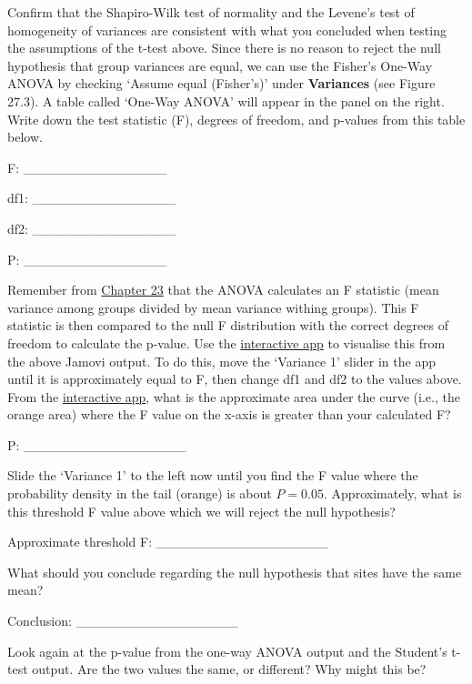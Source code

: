 \documentclass[
]{scrbook}
\begin{document}
Confirm that the Shapiro-Wilk test of normality and the Levene's test of homogeneity of variances are consistent with what you concluded when testing the assumptions of the t-test above.
Since there is no reason to reject the null hypothesis that group variances are equal, we can use the Fisher's One-Way ANOVA by checking `Assume equal (Fisher's)' under \textbf{Variances} (see Figure 27.3).
A table called `One-Way ANOVA' will appear in the panel on the right.
Write down the test statistic (F), degrees of freedom, and p-values from this table below.

F: \_\_\_\_\_\_\_\_\_\_\_\_\_\_\_

df1: \_\_\_\_\_\_\_\_\_\_\_\_\_\_\_

df2: \_\_\_\_\_\_\_\_\_\_\_\_\_\_\_

P: \_\_\_\_\_\_\_\_\_\_\_\_\_\_\_

Remember from \protect\hyperlink{Chapter_23}{Chapter 23} that the ANOVA calculates an F statistic (mean variance among groups divided by mean variance withing groups).
This F statistic is then compared to the null F distribution with the correct degrees of freedom to calculate the p-value.
Use the \href{https://bradduthie.shinyapps.io/f_distribution/}{interactive app} to visualise this from the above Jamovi output.
To do this, move the `Variance 1' slider in the app until it is approximately equal to F, then change df1 and df2 to the values above.
From the \href{https://bradduthie.shinyapps.io/f_distribution/}{interactive app}, what is the approximate area under the curve (i.e., the orange area) where the F value on the x-axis is greater than your calculated F?

P: \_\_\_\_\_\_\_\_\_\_\_\_\_\_\_\_\_

Slide the `Variance 1' to the left now until you find the F value where the probability density in the tail (orange) is about \(P = 0.05\).
Approximately, what is this threshold F value above which we will reject the null hypothesis?

Approximate threshold F: \_\_\_\_\_\_\_\_\_\_\_\_\_\_\_\_\_\_

What should you conclude regarding the null hypothesis that sites have the same mean?

Conclusion: \_\_\_\_\_\_\_\_\_\_\_\_\_\_\_\_\_

Look again at the p-value from the one-way ANOVA output and the Student's t-test output.
Are the two values the same, or different?
Why might this be?

\begin{verbatim}



\end{verbatim}
\end{document}
